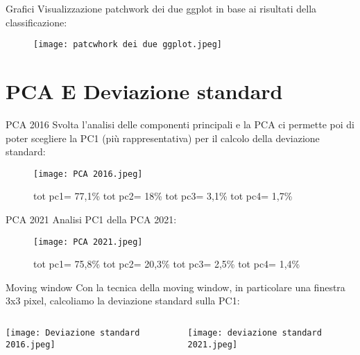 \documentclass{beamer} %
\begin{document}
            \begin{frame}{Grafici}
            Visualizzazione patchwork dei due ggplot in base ai risultati della classificazione:
            \begin{figure}
                \centering
                \texttt{[image: patcwhork dei due ggplot.jpeg]}
            \end{figure}
                
            \end{frame}

\section{PCA E Deviazione standard}
\begin{frame}{PCA 2016}
Svolta l'analisi delle componenti principali e la PCA ci permette poi di poter scegliere la PC1 (più rappresentativa) per il calcolo della deviazione standard:
    \begin{SCfigure}
   \centering
\texttt{[image: PCA 2016.jpeg]}
 \caption{tot pc1= 77,1\%
tot pc2= 18\%
tot pc3= 3,1\%
tot pc4= 1,7\%}
    
    \end{SCfigure}  
     \end{frame}

    \begin{frame}{PCA 2021}
    Analisi PC1 della PCA 2021:
    \begin{SCfigure}
            \centering
            \texttt{[image: PCA 2021.jpeg]}
            \caption{tot pc1= 75,8\%
tot pc2= 20,3\%
tot pc3= 2,5\%
tot pc4= 1,4\%}
            
    \end{SCfigure}
        
    \end{frame}

    \begin{frame}{Moving window}
    Con la tecnica della moving window, in particolare una finestra 3x3 pixel, calcoliamo la deviazione standard sulla PC1:
     \bigskip
     \begin{columns}
     \begin{column}{0.6\textwidth}
\begin{center}
    \texttt{[image: Deviazione standard 2016.jpeg]}
    \caption{2016}
\end{center}
\end{column}
\begin{column}{0.6\textwidth}  
    \begin{center}
     \texttt{[image: deviazione standard 2021.jpeg]}
     \caption{2021}
     \end{center}
\end{column}
\end{columns}
 \end{frame}
\end{document}
